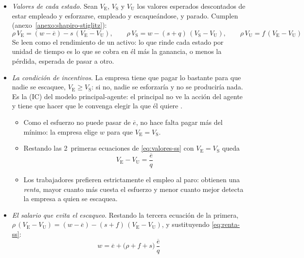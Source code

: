 \documentclass[11pt]{article}
\begin{document}
\begin{itemize}
\item \emph{Valores de cada estado}. Sean $V_{\mathrm E}$, $V_{\mathrm S}$ y $V_{\mathrm U}$ los valores esperados descontados de estar empleado y esforzarse, empleado y escaqueándose, y parado. Cumplen (anexo~\ref{anexo:shapiro-stiglitz}):
  \begin{equation}
  \rho\,V_{\mathrm E}=(w-\overline{e})-s\,(V_{\mathrm E}-V_{\mathrm U}),\qquad \rho\,V_{\mathrm S}=w-(s+q)\,(V_{\mathrm S}-V_{\mathrm U}),\qquad \rho\,V_{\mathrm U}=f\,(V_{\mathrm E}-V_{\mathrm U}) \label{eq:valores-ss}
  \end{equation}
  Se leen como el rendimiento de un activo: lo que rinde cada estado por unidad de tiempo es lo que se cobra en él más la ganancia, o menos la pérdida, esperada de pasar a otro.
\item \emph{La condición de incentivos}. La empresa tiene que pagar lo bastante para que nadie se escaquee, $V_{\mathrm E}\geq V_{\mathrm S}$: si no, nadie se esforzaría y no se produciría nada. Es la  (IC) del modelo principal-agente: el principal no ve la acción del agente y tiene que hacer que le convenga elegir la que él quiere .
  \begin{itemize}
  \item Como el esfuerzo no puede pasar de $\overline{e}$, no hace falta pagar más del mínimo: la empresa elige $w$ para que $V_{\mathrm E}=V_{\mathrm S}$.
  \item Restando las 2~primeras ecuaciones de \eqref{eq:valores-ss} con $V_{\mathrm E}=V_{\mathrm S}$ queda
    \begin{equation}
    V_{\mathrm E}-V_{\mathrm U}=\frac{\overline{e}}{q} \label{eq:renta-ss}
    \end{equation}
  \item Los trabajadores prefieren estrictamente el empleo al paro: obtienen una \emph{renta}, mayor cuanto más cuesta el esfuerzo y menor cuanto mejor detecta la empresa a quien se escaquea.
  \end{itemize}
\item \emph{El salario que evita el escaqueo}. Restando la tercera ecuación de la primera, $\rho\,(V_{\mathrm E}-V_{\mathrm U})=(w-\overline{e})-(s+f)\,(V_{\mathrm E}-V_{\mathrm U})$, y sustituyendo \eqref{eq:renta-ss}:
  \begin{equation}
  w=\overline{e}+\big(\rho+f+s\big)\,\frac{\overline{e}}{q} \label{eq:ss-salario-f}
  \end{equation}

\end{itemize}
\end{document}
